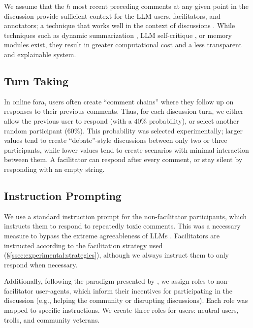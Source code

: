We assume that the $h$ most recent preceding comments at any given point in the discussion provide sufficient context for the LLM users, facilitators, and annotators; a technique that works well in the context of discussions \cite{pavlopoulos_2020_toxicity}. While techniques such as dynamic summarization \cite{balog_2024}, LLM self-critique \cite{yu_2024_fincon}, or memory modules \cite{Vezhnevets2023GenerativeAM} exist, they result in greater computational cost and a less transparent and explainable system.


\subsection{Turn Taking}
\label{ssec:methodology:turn}

In online fora, users often create ``comment chains'' where they follow up on responses to their previous comments. Thus, for each discussion turn, we either allow the previous user to respond (with a $40\%$ probability), or select another random participant ($60\%$). This probability was selected experimentally; larger values tend to create ``debate''-style discussions between only two or three participants, while lower values tend to create scenarios with minimal interaction between them. A facilitator can respond after every comment, or stay silent by responding with an empty string.


\subsection{Instruction Prompting}
\label{ssec:methodology:prompts-instructions}

We use a standard instruction prompt for the non-facilitator participants, which instructs them to respond to repeatedly toxic comments. This was a necessary measure to bypass the extreme agreeableness of LLMs \cite{park2023game}. Facilitators are instructed according to the facilitation strategy used (\S\ref{ssec:experimental:strategies}), although we always instruct them to only respond when necessary.

Additionally, following the paradigm presented by \citet{abdelnabi_negotiations}, we assign roles to non-facilitator user-agents, which inform their incentives for participating in the discussion (e.g., helping the community or disrupting discussions). Each role was mapped to specific instructions. We create three roles for users: neutral users, trolls, and community veterans.    


